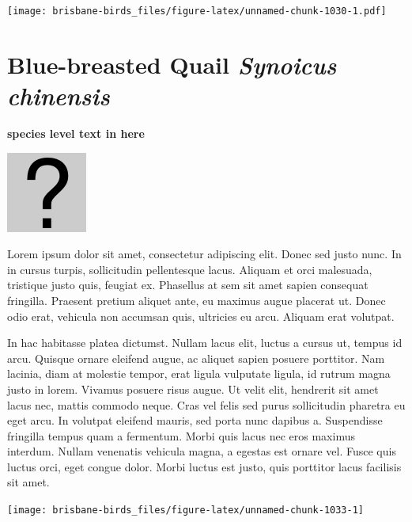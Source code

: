 \documentclass[]{book}
\let\origfigure\figure
\let\endorigfigure\endfigure
\renewenvironment{figure}[1][2] {
  \expandafter\origfigure\expandafter[H]
} {
  \endorigfigure
}
\begin{document}
\begin{figure}
\centering
\texttt{[image: brisbane-birds\_files/figure-latex/unnamed-chunk-1030-1.pdf]}
\caption{\label{fig:unnamed-chunk-1030}insert figure caption}
\end{figure}

\section{\texorpdfstring{Blue-breasted Quail \emph{Synoicus
chinensis}}{Blue-breasted Quail Synoicus chinensis}}\label{blue-breasted-quail-synoicus-chinensis}

\textbf{species level text in here}

\begin{figure}
\centering
\includegraphics{assets/missing.png}
\caption{No image for species}
\end{figure}

Lorem ipsum dolor sit amet, consectetur adipiscing elit. Donec sed justo
nunc. In in cursus turpis, sollicitudin pellentesque lacus. Aliquam et
orci malesuada, tristique justo quis, feugiat ex. Phasellus at sem sit
amet sapien consequat fringilla. Praesent pretium aliquet ante, eu
maximus augue placerat ut. Donec odio erat, vehicula non accumsan quis,
ultricies eu arcu. Aliquam erat volutpat.

In hac habitasse platea dictumst. Nullam lacus elit, luctus a cursus ut,
tempus id arcu. Quisque ornare eleifend augue, ac aliquet sapien posuere
porttitor. Nam lacinia, diam at molestie tempor, erat ligula vulputate
ligula, id rutrum magna justo in lorem. Vivamus posuere risus augue. Ut
velit elit, hendrerit sit amet lacus nec, mattis commodo neque. Cras vel
felis sed purus sollicitudin pharetra eu eget arcu. In volutpat eleifend
mauris, sed porta nunc dapibus a. Suspendisse fringilla tempus quam a
fermentum. Morbi quis lacus nec eros maximus interdum. Nullam venenatis
vehicula magna, a egestas est ornare vel. Fusce quis luctus orci, eget
congue dolor. Morbi luctus est justo, quis porttitor lacus facilisis sit
amet.

\begin{figure}
\texttt{[image: brisbane-birds\_files/figure-latex/unnamed-chunk-1033-1]} \caption{insert figure caption}\label{fig:unnamed-chunk-1033}
\end{figure}
\end{document}
